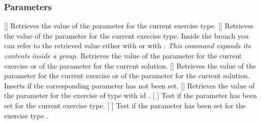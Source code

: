 \documentclass{xsim-manual}
\begin{document}
\subsubsection{Parameters}
\begin{commands}
  \expandable{}[]
    Retrieves the value of the parameter  for the current
    exercise type.
  []
    Retrieves the value of the parameter 
    for the current exercise type. Inside the  branch you can refer
    to the retrieved value either with  or with .
    \emph{This command expands its contents inside a group.}
  \expandable{}
    Retrieves the value of the parameter  for the
    current exercise or of the parameter  for the
    current solution.
  \expandable{}[]
    Retrieves the value of the parameter
     for the current exercise or of the parameter
     for the current solution.  Inserts
     if the corresponding parameter has not been set.
  \expandable{}[]
    Retrieves the value of the parameter  for the exercise of type
     with id .
  \expandable{}[%
    ]
    Test if the parameter  has been set for
    the current exercise type.
  \expandable{}[%
    ]
    Test if the parameter  has been set for
    the exercise type .
\end{commands}
\end{document}
